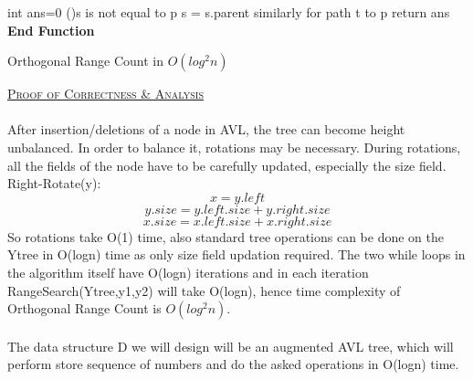 \documentclass[a4 paper]{article}
\begin{document}
\begin{algorithm}[H]
\SetAlgoLined
{}
%
\Fn{\FRecurs}
{
int ans=0\;
\While(){s is not equal to p}{
s = s.parent\;
}
similarly for path t to p\;
return ans\;
}
\textbf{End Function}
\caption{Orthogonal Range Count in $O(log^{2}n)$}
\end{algorithm}
\vspace{4mm}
\newpage
{}
\underline{\textsc{Proof of Correctness \& Analysis}}\\\\
After insertion/deletions of a node in AVL, the tree can become height unbalanced. In order to balance it, rotations may be necessary. During rotations, all the fields of the node have to be carefully updated, especially the size field. Right-Rotate(y):
$$x = y.left$$
$$y.size = y.left.size + y.right.size $$
$$x.size = x.left.size + x.right.size $$
So rotations take O(1) time, also standard tree operations can be done on the Ytree in O(logn) time as only size field updation required. The two while loops in the algorithm itself have O(logn) iterations and in each iteration RangeSearch(Ytree,y1,y2) will take O(logn), hence time complexity of Orthogonal Range Count is $O(log^{2}n)$.\\\\
The data structure D we will design will be an augmented AVL tree, which will perform store sequence of numbers and do the asked operations in O(logn) time. \\
\end{document}
